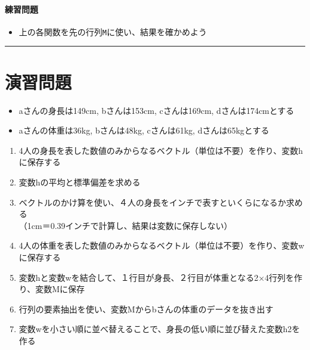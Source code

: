 \documentclass[
]{book}
\providecommand{\tightlist}{%
  \setlength{\itemsep}{0pt}\setlength{\parskip}{0pt}}
\begin{document}
\hypertarget{ux7df4ux7fd2ux554fux984c-3}{%
\paragraph*{練習問題}\label{ux7df4ux7fd2ux554fux984c-3}}

\begin{itemize}
\tightlist
\item
  上の各関数を先の行列\texttt{M}に使い、結果を確かめよう
\end{itemize}

\begin{center}\rule{0.5\linewidth}{0.5pt}\end{center}

\hypertarget{ux6f14ux7fd2ux554fux984c-1}{%
\section{演習問題}\label{ux6f14ux7fd2ux554fux984c-1}}

\begin{itemize}
\tightlist
\item
  aさんの身長は149cm, bさんは153cm, cさんは169cm, dさんは174cmとする
\item
  aさんの体重は36kg, bさんは48kg, cさんは61kg, dさんは65kgとする\\
\end{itemize}

\begin{enumerate}
\def\labelenumi{\arabic{enumi}.}
\tightlist
\item
  4人の身長を表した数値のみからなるベクトル（単位は不要）を作り、変数hに保存する\\
\item
  変数hの平均と標準偏差を求める\\
\item
  ベクトルのかけ算を使い、４人の身長をインチで表すといくらになるか求める\\
  （1cm＝0.39インチで計算し、結果は変数に保存しない）\\
\item
  4人の体重を表した数値のみからなるベクトル（単位は不要）を作り、変数wに保存する
\item
  変数hと変数wを結合して、１行目が身長、２行目が体重となる2×4行列を作り、変数Mに保存\\
\item
  行列の要素抽出を使い、変数Mからbさんの体重のデータを抜き出す
\item
  変数wを小さい順に並べ替えることで、身長の低い順に並び替えた変数h2を作る
\end{enumerate}
\end{document}

